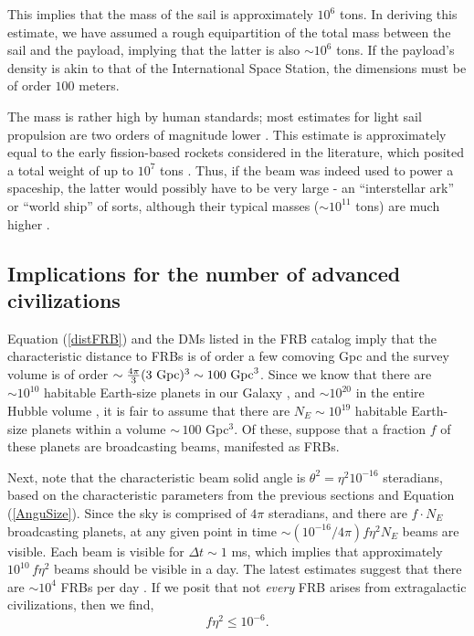 \documentclass[twocolumn,tighten]{aastex61}
\begin{document}
This implies that the mass of the sail is approximately $10^6$ tons. In deriving this estimate, we have assumed a rough equipartition of the total mass between the sail and the payload, implying that the latter is also $\sim 10^6$ tons. If the payload's density is akin to that of the International Space Station, the dimensions must be of order $100$ meters.

The mass is rather high by human standards; most estimates for light sail propulsion are two orders of magnitude lower \citep{Craw90,VJM15}. This estimate is approximately equal to the early fission-based rockets considered in the literature, which posited a total weight of up to $10^7$ tons \citep{Dys68}. Thus, if the beam was indeed used to power a spaceship, the latter would possibly have to be very large - an ``interstellar ark'' or ``world ship'' of sorts, although their typical masses ($\sim 10^{11}$ tons) are much higher \citep{HPPBR}.

\subsection{Implications for the number of advanced civilizations} \label{SSecFermiP}
Equation (\ref{distFRB}) and the DMs listed in the FRB catalog imply that the characteristic distance to FRBs is of order a few comoving Gpc \citep{Pet16} and the survey volume is of order $\sim \frac{4\pi}{3} (3~{\rm Gpc})^3\sim 100~{\rm Gpc}^3$. Since we know that there are $\sim 10^{10}$ habitable Earth-size planets in our Galaxy \citep{DC15,BC15,WF15}, and $\sim 10^{20}$ in the entire Hubble volume \citep{BP15}, it is fair to assume that there are $N_E \sim 10^{19}$ habitable Earth-size planets within a volume $\sim\,100$ Gpc$^3$. Of these, suppose that a fraction $f$ of these planets are broadcasting beams, manifested as FRBs. 

Next, note that the characteristic beam solid angle is $\theta^2 = \eta^2 10^{-16}$ steradians, based on the characteristic parameters from the previous sections and Equation (\ref{AnguSize}). Since the sky is comprised of $4\pi$ steradians, and there are $f \cdot N_E$ broadcasting planets, at any given point in time $\sim (10^{-16}/4\pi) f \eta^2 N_E$ beams are visible. Each beam is visible for $\Delta t \sim 1$ ms, which implies that approximately $10^{10}\, f \eta^2$ beams should be visible in a day. The latest estimates suggest that there are $\sim 10^4$ FRBs per day \citep{SSHC16}. If we posit that not \emph{every} FRB arises from extragalactic civilizations, then we find,
\begin{equation} \label{IntLifeFrac}
f \eta^2 \leq 10^{-6}.
\end{equation}
\end{document}
